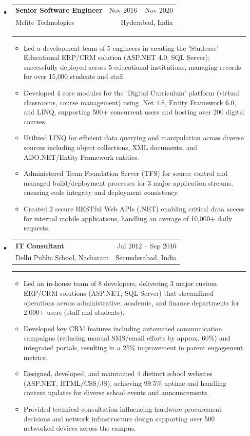 \documentclass[12pt]{article}
\makeatletter
\newcommand{\CompanyTwo}{Melite Technologies}
\newcommand{\CompanyThree}{Delhi Public School, Nacharam}
\newcommand{\resumeItem}[1]{
  \item\small{
    {#1 \vspace{-2pt}}
  }
}
\newcommand{\resumeSubheading}[4]{
  \item %
    \begin{tabular*}{0.97\textwidth}[t]{l@{\extracolsep{\fill}}r}
       {\textbf{#1}} & \small{#2} \\ 
       {\small#3} & \small {#4} \\ 
    \end{tabular*} \vspace{2pt} %
    \noindent\rule{0.97\textwidth}{0.4pt} \vspace{-4pt} %
}
\newcommand{\resumeItemListStart}{\begin{itemize}[leftmargin=0.25in]} %
\newcommand{\resumeItemListEnd}{\end{itemize}\vspace{-5pt}}
\makeatother
\begin{document}
\begin{itemize}[leftmargin=0in, label={}]
    \resumeSubheading
      {Senior Software Engineer}{Nov 2016 – Nov 2020}
      {{\CompanyTwo}}{Hyderabad, India}
      \resumeItemListStart
        \resumeItem{Led a development team of 5 engineers in creating the 'Studease' Educational ERP/CRM solution (ASP.NET 4.0, SQL Server); successfully deployed across 5 educational institutions, managing records for over 15,000 students and staff.}
        \resumeItem{Developed 4 core modules for the 'Digital Curriculum' platform (virtual classrooms, course management) using .Net 4.8, Entity Framework 6.0, and LINQ, supporting 500+ concurrent users and hosting over 200 digital courses.}
        \resumeItem{Utilized LINQ for efficient data querying and manipulation across diverse sources including object collections, XML documents, and ADO.NET/Entity Framework entities.}
        \resumeItem{Administered Team Foundation Server (TFS) for source control and managed build/deployment processes for 3 major application streams, ensuring code integrity and deployment consistency.}
        \resumeItem{Created 2 secure RESTful Web APIs (.NET) enabling critical data access for internal mobile applications, handling an average of 10,000+ daily requests.}
      \resumeItemListEnd %
      
    \resumeSubheading
      {IT Consultant}{Jul 2012 – Sep 2016}
      {{\CompanyThree}}{Secunderabad, India}
      \resumeItemListStart
        \resumeItem{Led an in-house team of 8 developers, delivering 3 major custom ERP/CRM solutions (ASP.NET, SQL Server) that streamlined operations across administrative, academic, and finance departments for 2,000+ users (staff and students).}
        \resumeItem{Developed key CRM features including automated communication campaigns (reducing manual SMS/email efforts by approx. 60\%) and integrated portals, resulting in a 25\% improvement in parent engagement metrics.}
        \resumeItem{Designed, developed, and maintained 4 distinct school websites (ASP.NET, HTML/CSS/JS), achieving 99.5\% uptime and handling content updates for diverse school events and announcements.}
        \resumeItem{Provided technical consultation influencing hardware procurement decisions and network infrastructure design supporting over 500 networked devices across the campus.}
      \resumeItemListEnd %


\end{itemize}
\end{document}

